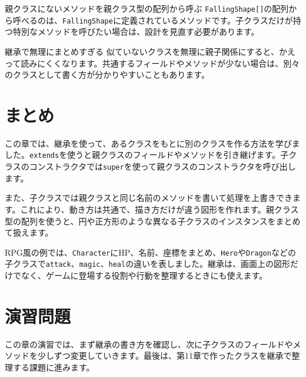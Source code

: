 \begin{mistakebox}{親クラスにないメソッドを親クラス型の配列から呼ぶ}
\texttt{FallingShape[]}の配列から呼べるのは、\texttt{FallingShape}に定義されているメソッドです。子クラスだけが持つ特別なメソッドを呼びたい場合は、設計を見直す必要があります。
\end{mistakebox}

\begin{mistakebox}{継承で無理にまとめすぎる}
似ていないクラスを無理に親子関係にすると、かえって読みにくくなります。共通するフィールドやメソッドが少ない場合は、別々のクラスとして書く方が分かりやすいこともあります。
\end{mistakebox}

\section{まとめ}

この章では、継承を使って、あるクラスをもとに別のクラスを作る方法を学びました。\texttt{extends}を使うと親クラスのフィールドやメソッドを引き継げます。子クラスのコンストラクタでは\texttt{super}を使って親クラスのコンストラクタを呼び出します。

また、子クラスでは親クラスと同じ名前のメソッドを書いて処理を上書きできます。これにより、動き方は共通で、描き方だけが違う図形を作れます。親クラス型の配列を使うと、円や正方形のような異なる子クラスのインスタンスをまとめて扱えます。

RPG風の例では、\texttt{Character}にHP、名前、座標をまとめ、\texttt{Hero}や\texttt{Dragon}などの子クラスで\texttt{attack}、\texttt{magic}、\texttt{heal}の違いを表しました。継承は、画面上の図形だけでなく、ゲームに登場する役割や行動を整理するときにも使えます。

\section{演習問題}

この章の演習では、まず継承の書き方を確認し、次に子クラスのフィールドやメソッドを少しずつ変更していきます。最後は、第11章で作ったクラスを継承で整理する課題に進みます。

